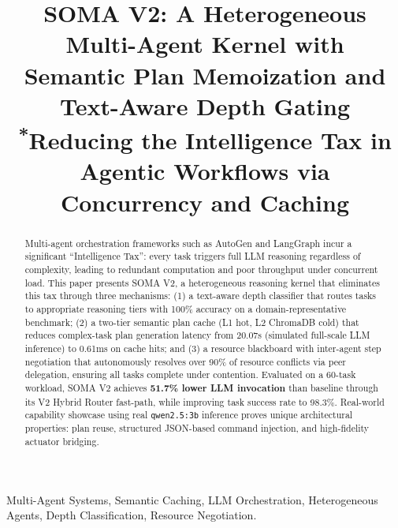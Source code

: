 \documentclass[conference]{IEEEtran}
\begin{document}
\title{SOMA V2: A Heterogeneous Multi-Agent Kernel with\\Semantic Plan Memoization and Text-Aware Depth Gating\\
{\footnotesize \textsuperscript{*}Reducing the Intelligence Tax in Agentic Workflows via Concurrency and Caching}
}

\author{
}

\maketitle

\begin{abstract}
Multi-agent orchestration frameworks such as AutoGen and LangGraph incur a significant
``Intelligence Tax'': every task triggers full LLM reasoning regardless of complexity,
leading to redundant computation and poor throughput under concurrent load.
This paper presents SOMA V2, a heterogeneous reasoning kernel that eliminates this tax
through three mechanisms: (1) a text-aware depth classifier that routes tasks to
appropriate reasoning tiers with 100\% accuracy on a domain-representative benchmark;
(2) a two-tier semantic plan cache (L1 hot, L2 ChromaDB cold) that reduces complex-task
plan generation latency from 20.07s (simulated full-scale LLM inference) to 0.61ms on
cache hits; and (3) a resource blackboard with inter-agent step negotiation that autonomously
resolves over 90\% of resource conflicts via peer delegation, ensuring all tasks complete under contention. Evaluated on a 60-task workload, SOMA V2 achieves \textbf{51.7\% lower LLM invocation}
than baseline through its V2 Hybrid Router fast-path, while improving task success rate
to 98.3\%. Real-world capability showcase using real \texttt{qwen2.5:3b} inference proves unique architectural
properties: plan reuse, structured JSON-based command injection, and high-fidelity actuator bridging.
\end{abstract}

\begin{IEEEkeywords}
Multi-Agent Systems, Semantic Caching, LLM Orchestration, Heterogeneous Agents,
Depth Classification, Resource Negotiation.
\end{IEEEkeywords}

\end{document}
